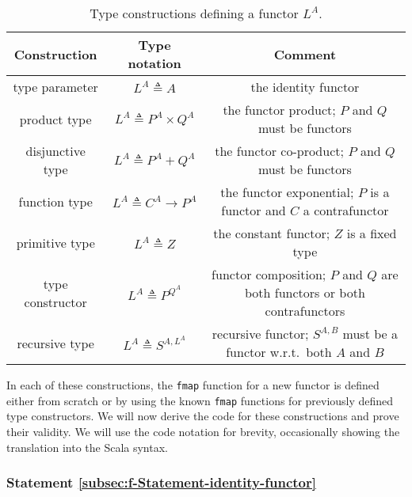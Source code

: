 \begin{table}
\begin{centering}
\begin{tabular}{|c|c|c|}
\hline 
\textbf{\small{}Construction} & \textbf{\small{}Type notation} & \textbf{\small{}Comment}\tabularnewline
\hline 
\hline 
{\footnotesize{}type parameter} & {\footnotesize{}$L^{A}\triangleq A$} & {\footnotesize{}the identity functor}\tabularnewline
\hline 
{\footnotesize{}product type} & {\footnotesize{}$L^{A}\triangleq P^{A}\times Q^{A}$} & {\footnotesize{}the functor product; $P$ and $Q$ must be functors}\tabularnewline
\hline 
{\footnotesize{}disjunctive type} & {\footnotesize{}$L^{A}\triangleq P^{A}+Q^{A}$} & {\footnotesize{}the functor co-product; $P$ and $Q$ must be functors}\tabularnewline
\hline 
{\footnotesize{}function type} & {\footnotesize{}$L^{A}\triangleq C^{A}\rightarrow P^{A}$} & {\footnotesize{}the functor exponential; $P$ is a functor and $C$
a contrafunctor}\tabularnewline
\hline 
{\footnotesize{}primitive type} & {\footnotesize{}$L^{A}\triangleq Z$} & {\footnotesize{}the constant functor; $Z$ is a fixed type}\tabularnewline
\hline 
{\footnotesize{}type constructor} & {\footnotesize{}$L^{A}\triangleq P^{Q^{A}}$} & {\footnotesize{}functor composition; $P$ and $Q$ are both functors
or both contrafunctors}\tabularnewline
\hline 
{\footnotesize{}recursive type} & {\footnotesize{}$L^{A}\triangleq S^{A,L^{A}}$} & {\footnotesize{}recursive functor; $S^{A,B}$ must be a functor w.r.t.~both
$A$ and $B$}\tabularnewline
\hline 
\end{tabular}
\par\end{centering}
\caption{Type constructions defining a functor $L^{A}$.\label{tab:f-Functor-constructions}}
\end{table}

In each of these constructions, the \lstinline!fmap! function for
a new functor is defined either from scratch or by using the known
\lstinline!fmap! functions for previously defined type constructors.
We will now derive the code for these constructions and prove their
validity. We will use the code notation for brevity, occasionally
showing the translation into the Scala syntax.

\subsubsection{Statement \label{subsec:f-Statement-identity-functor}\ref{subsec:f-Statement-identity-functor}}

